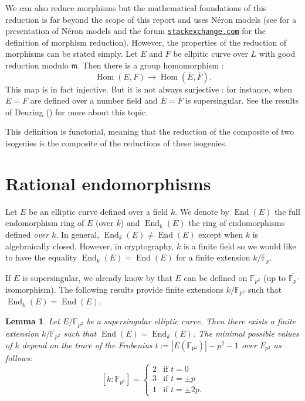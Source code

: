 \documentclass[a4paper,10pt]{report}
\theoremstyle{definition}
\theoremstyle{plain}
\newtheorem{Lemma}[Definition]{Lemma}
\theoremstyle{definition}
\newcommand{\F}{\mathbb{F}}
\renewcommand{\(}{\left(}
\renewcommand{\)}{\right)}
\newcommand{\mfm}{\mathfrak{m}}
\DeclareMathOperator{\Hom}{Hom}
\DeclareMathOperator{\End}{End}
\begin{document}
We can also reduce morphisms but the mathematical foundations of this reduction is far beyond the scope of this report and uses N\'{e}ron models (see \cite[chapter IV]{Silverman2} for a presentation of N\'{e}ron models and the forum \href{https://math.stackexchange.com/questions/2352060/definition-of-the-natural-reduction-map-tilde-phi-for-phie-1-to-e-2-an}{\protect\Verb+stackexchange.com+} for the definition of morphism reduction).  However,  the properties of the reduction of morphisms can be stated simply.  Let $E$ and $F$ be ellpitic curve over $L$ with good reduction modulo $\mfm$.  Then there is a group homomorphism :
\[\Hom(E,F)\longrightarrow\Hom(\overline{E},\overline{F}).\]
This map is in fact injective.  But it is not always surjective : for instance,  when $E=F$ are defined over a number field and $\overline{E}=\overline{F}$ is supersingular.  See the results of Deuring (\cite[chapter 13]{Lang_EF}) for more about this topic.   

This definition is functorial,  meaning that the reduction of the composite of two isogenies is the composite of the reductions of these isogenies.  

\section{Rational endomorphisms}

Let $E$ be an elliptic curve defined over a field $k$.  We denote by $\End(E)$ the full endomorphism ring of $E$ (over $\overline{k}$) and $\End_k(E)$ the ring of endomorphisms defined \emph{over $k$}.  In general,  $\End_k(E)\neq\End(E)$ except when $k$ is algebraically closed.  However,  in cryptography,  $k$ is a finite field so we would like to have the equality $\End_k(E)=\End(E)$ for a finite extension $k/\F_p$.

If $E$ is supersingular,  we already know by \cite[Theorem V.3.1]{Silverman1} that $E$ can be defined on $\F_{p^2}$ (up to $\overline{\F_p}$-isomorphism).  The following results provide finite extensions $k/\F_{p^2}$ such that $\End_k(E)=\End(E)$.

\begin{Lemma}
Let $E/\F_{p^2}$ be a supersingular elliptic curve.  Then there exists a finite extension $k/\F_{p^2}$ such that $\End(E)=\End_k(E)$.  The minimal possible values of $k$ depend on the trace of the Frobenius $t:=|E(\F_{p^2})|-p^2-1$ over $F_{p^2}$ as follows:
\[[k:\F_{p^2}]=\left\{
\begin{array}{cl}
2 & \mbox{if } t=0\\
3 & \mbox{if } t=\pm p\\
1 & \mbox{if } t=\pm 2p. 
\end{array}
\right.\]
\end{Lemma}
\end{document}
